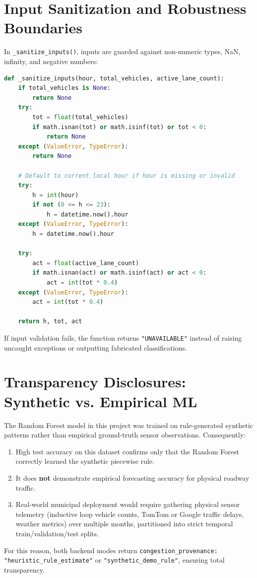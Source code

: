 \section{Input Sanitization and Robustness Boundaries}
In \texttt{_sanitize_inputs()}, inputs are guarded against non-numeric types, NaN, infinity, and negative numbers:
\begin{lstlisting}[language=Python]
def _sanitize_inputs(hour, total_vehicles, active_lane_count):
    if total_vehicles is None:
        return None
    try:
        tot = float(total_vehicles)
        if math.isnan(tot) or math.isinf(tot) or tot < 0:
            return None
    except (ValueError, TypeError):
        return None

    # Default to current local hour if hour is missing or invalid
    try:
        h = int(hour)
        if not (0 <= h <= 23):
            h = datetime.now().hour
    except (ValueError, TypeError):
        h = datetime.now().hour

    try:
        act = float(active_lane_count)
        if math.isnan(act) or math.isinf(act) or act < 0:
            act = int(tot * 0.4)
    except (ValueError, TypeError):
        act = int(tot * 0.4)

    return h, tot, act
\end{lstlisting}
If input validation fails, the function returns \texttt{"UNAVAILABLE"} instead of raising uncaught exceptions or outputting fabricated classifications.

\section{Transparency Disclosures: Synthetic vs. Empirical ML}
\begin{limitationbox}
The Random Forest model in this project was trained on rule-generated synthetic patterns rather than empirical ground-truth sensor observations. Consequently:
\begin{enumerate}
    \item High test accuracy on this dataset confirms only that the Random Forest correctly learned the synthetic piecewise rule.
    \item It does \textbf{not} demonstrate empirical forecasting accuracy for physical roadway traffic.
    \item Real-world municipal deployment would require gathering physical sensor telemetry (inductive loop vehicle counts, TomTom or Google traffic delays, weather metrics) over multiple months, partitioned into strict temporal train/validation/test splits.
\end{enumerate}
For this reason, both backend modes return \texttt{congestion\_provenance: "heuristic\_rule\_estimate"} or \texttt{"synthetic\_demo\_rule"}, ensuring total transparency.
\end{limitationbox}
